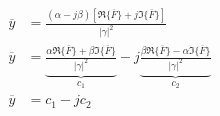 \documentclass[11pt,italian]{article}
\theoremstyle{remark}
\begin{document}
\begin{align*}
    \overline{y} & = \frac{(\alpha - j \beta ) \left[ \Re \{\overline{F}\} + j \Im \{\overline{F}\} \right]}{|\gamma|^2}                                                                                                 \\
    \overline{y} & = \underbrace{\frac{\alpha \Re \{\overline{F}\} + \beta \Im \{\overline{F}\} }{|\gamma|^2}}_{c_1} - j \underbrace{\frac{\beta \Re \{\overline{F}\} - \alpha \Im \{\overline{F}\} }{|\gamma|^2}}_{c_2} \\
    \overline{y} & = c_1 - j c_2                                                                                                                                                                                         \\
\end{align*}

\newpage
\end{document}
